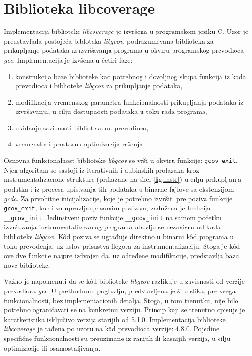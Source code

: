 \documentclass[12pt,oneside]{memoir}
\newcommand{\kod}[1]{\texttt{#1}}
\newcommand{\strano}[1]{\textit{#1}}
\begin{document}
\section{Biblioteka libcoverage}

Implementacija biblioteke \strano{libcoverage} je izvršena u programskom jeziku C. Uzor je predstavljala postojeća bibloteka \strano{libgcov}, podrazumevana biblioteka za prikupljanje podataka iz izvršavanja programa u okviru programskog prevodioca \strano{gcc}. Implementacija je izvšena u četiri faze:
\begin{enumerate}
\item konstrukcija baze biblioteke kao potrebnog i dovoljnog skupa funkcija iz koda prevodioca i biblioteke \strano{libgcov} za prikupljanje podataka,
\item modifikacija vremenskog parametra funkcionalnosti prikupljanja podataka iz izvršavanja, u cilju dostupnosti podataka u toku rada programa,
\item ukidanje zavisnosti biblioteke od prevodioca,
\item vremenska i prostorna optimizacija rešenja.
\end{enumerate}


Osnovna funkcionalnost biblioteke \strano{libgcov} se vrši u okviru funkcije: \kod{gcov\_exit}. Njen algoritam se sastoji iz iterativnih i dubinskih prolazaka kroz instrumentalizacione strukture (prikazane na slici \ref{fig:instr}) u cilju prikupljanja podatka i iz procesa upisivanja tih podataka u binarne fajlove sa ekstenzijom \strano{gcda}. Za prvobitne inicijalizacije, koje je potrebno izvršiti pre poziva funkcije \kod{gcov\_exit}, kao i za upravljanje samim pozivom, zadužena je funkcija \kod{\_\_gcov\_init}. Jedinstveni poziv funkcije \kod{\_\_gcov\_init} na samom početku izvršavanja instrumentalizovanog programa obavlja se nezavisno od koda biblioteke \strano{libgcov}. K\^{o}d poziva se ugrađuje direktno u binarni k\^{o}d programa u toku prevođenja, uz uslov prisustva flegova za instrumentalizaciju. Stoga je k\^{o}d ove dve funkcije najpre izdvojen da, uz određene modifikacije, predstavlja bazu nove biblioteke. 

Važno je napomenuti da se k\^{o}d biblioteke \strano{libgcov} razlikuje u zavisnosti od verzije prevodioca \strano{gcc}. U prethodnom poglavlju, predstavljena je šira slika, pre svega funkcionalnosti, bez implementacionih detalja. Stoga, u tom trenutku, nije bilo potrebno ograničavati se na konkretnu verziju. Princip koji se trenutno opisuje je karatkeristika isključivo verzija starijih od 5.1.0. Implementacija biblioteke \strano{libcoverage} je rađena po uzoru na k\^{o}d prevodioca verzije: 4.8.0. Pojedine specifične funkcionalnosti su preuzimane iz ranijih ili kasnijih verzija, u cilju optimizacije ili osamostaljivanja. 
\end{document}
